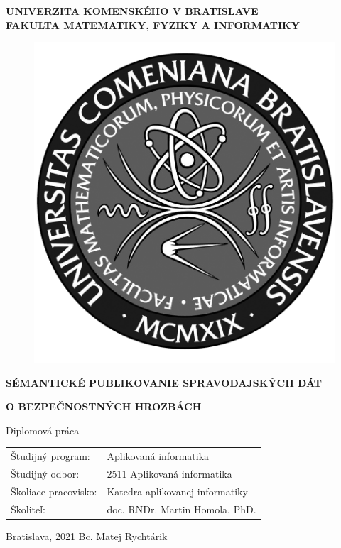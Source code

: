 \documentclass[12pt, a4paper, oneside]{book}
\newcommand\mftitle{Sémantické publikovanie spravodajských dát}
\newcommand\mftitlen{o bezpečnostných hrozbách}
\newcommand\mfthesistype{Diplomová práca}
\newcommand\mfauthor{Bc. Matej Rychtárik}
\newcommand\mfadvisor{doc. RNDr. Martin Homola, PhD.}
\newcommand\mfplacedate{Bratislava, 2021}
\newcommand\mfuniversity{UNIVERZITA KOMENSKÉHO V BRATISLAVE}
\newcommand\mffaculty{FAKULTA MATEMATIKY, FYZIKY A INFORMATIKY}
\begin{document}
\noindent
\begin{minipage}{\textwidth}
\begin{center}
\textbf{\mfuniversity \\
\mffaculty}
\end{center}
\end{minipage}

\vfill
\begin{figure}[!hbt]
\begin{center}
\includegraphics{images/logo_fmph_dark}
\label{img:logo_dark}
\end{center}
\end{figure}
\begin{center}
\begin{minipage}{0.8\textwidth}
\centerline{\textbf{\Large\MakeUppercase{\mftitle}}}
\centerline{\textbf{\Large\MakeUppercase{\mftitlen}}}
\smallskip
\centerline{\mfthesistype}
\end{minipage}
\end{center}
\vfill
\begin{tabular}{l l}
Študijný program: & Aplikovaná informatika\\
Študijný odbor: & 2511 Aplikovaná informatika\\
Školiace pracovisko: & Katedra aplikovanej informatiky\\
Školiteľ: & \mfadvisor
\end{tabular}
\vfill
\noindent
\mfplacedate \hfill
\mfauthor
\eject 
\end{document}
